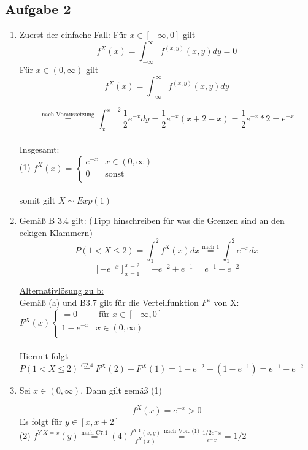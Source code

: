 \documentclass[10pt,a4paper]{article}
\begin{document}
\subsection{Aufgabe 2}
\begin{enumerate}[label=(\alph*)]
	\item Zuerst der einfache Fall: 
	Für $x\in [-\infty,0]$ gilt 
	$$f^X(x)= \int_{-\infty}^{\infty}f^{(x,y)}(x,y)dy=0$$
	Für $x\in (0,\infty)$ gilt
	$$f^X(x)= \int_{- \infty}^{\infty} f^{(x,y)} (x,y)dy $$
	
	$$\overset{\text{nach Voraussetzung}}{=} \int_{x}^{x+2}\frac{1}{2} e^{-x} dy = \frac{1}{2} e^{-x} (x+2-x) = \frac{1}{2} e^{-x} *2 = e^{-x}$$\\
	Insgesamt:\\
	(1) $ f^X(x)=\begin{cases}
	e^{-x} & x\in (0,\infty)\\
	0 & \text{sonst}\\
	\end{cases} $\\~\\somit gilt $X \sim Exp(1)$
	
	\item Gemäß B 3.4 gilt: (Tipp hinschreiben für was die Grenzen sind an den eckigen Klammern)
	$$P(1<X\leq 2) = \int_{1}^{2}f^X(x)dx \overset{\text{nach 1}}{=} \int_{1}^{2}e^{-x}dx$$
	$$\left[-e^{-x}\right]^{x=2}_{x=1} = -e^{-2}+e^{-1}=e^{-1}-e^{-2} $$
	
	\underline{Alternativlösung zu b:}\\
		Gemäß (a) und B3.7 gilt für die Verteilfunktion $F^x$ von X:\\ $ F^X (x) \begin{cases} = 0 & \text{ für } x \in [-\infty,0]\\ 1-e^{-x} &  x \in (0,\infty)\\ \end{cases}$\\~\\
	Hiermit folgt $P(1<X \leq 2) \overset{C 2.4}{=}  F^X(2)- F^X(1)= 1-e^{-2} - (1-e^{-1}) = e^{-1} - e^{-2}$\\
	
	
	\item Sei $x\in (0,\infty).$ Dann gilt gemäß (1) 
	
	$$f^X(x)=e^{-x}>0$$ Es folgt für $y\in [x,x+2]$\\
	(2) $ f^{Y|X=x}(y) \overset{\text{nach C7.1}}{=} (4) \frac{f^{X,Y}(x,y)}{f^X(x)} \overset{\text{nach Vor. (1)}}{=}  \frac{1/2 e^-x}{e^-x} = 1/2$\\~\\
	

\end{enumerate}
\end{document}
